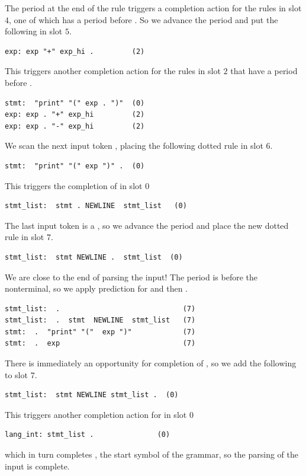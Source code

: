 \documentclass[7x10]{TimesAPriori_MIT}%
\numberwithin{theorem}{chapter}
\numberwithin{definition}{chapter}
\numberwithin{equation}{chapter}
\begin{document}
{The period at the end of the rule triggers a completion action for the
rules in slot $4$, one of which has a period before .
So we advance the period and put the following in slot $5$.
\begin{lstlisting}[escapechar=$]
exp: exp "+" exp_hi .         (2)
\end{lstlisting}
This triggers another completion action for the rules in slot $2$ that
have a period before .
\begin{lstlisting}[escapechar=$]
stmt:  "print" "(" exp . ")"  (0)
exp: exp . "+" exp_hi         (2)
exp: exp . "-" exp_hi         (2)
\end{lstlisting}

We scan the next input token , placing the following dotted
rule in slot $6$.
\begin{lstlisting}[escapechar=$]
stmt:  "print" "(" exp ")" .  (0)
\end{lstlisting}
This triggers the completion of  in slot $0$
\begin{lstlisting}
stmt_list:  stmt . NEWLINE  stmt_list   (0)
\end{lstlisting}
The last input token is a , so we advance the period
and place the new dotted rule in slot $7$.
\begin{lstlisting}
stmt_list:  stmt NEWLINE .  stmt_list  (0)
\end{lstlisting}
We are close to the end of parsing the input!
The period is before the  nonterminal, so we
apply prediction for  and then .
\begin{lstlisting}
stmt_list:  .                             (7)
stmt_list:  .  stmt  NEWLINE  stmt_list   (7)
stmt:  .  "print" "("  exp ")"            (7)
stmt:  .  exp                             (7)
\end{lstlisting}
There is immediately an opportunity for completion of ,
so we add the following to slot $7$.
\begin{lstlisting}
stmt_list:  stmt NEWLINE stmt_list .  (0)
\end{lstlisting}
This triggers another completion action for  in slot $0$
\begin{lstlisting}
lang_int: stmt_list .               (0)
\end{lstlisting}
which in turn completes , the start symbol of the
grammar, so the parsing of the input is complete.

}
\end{document}
